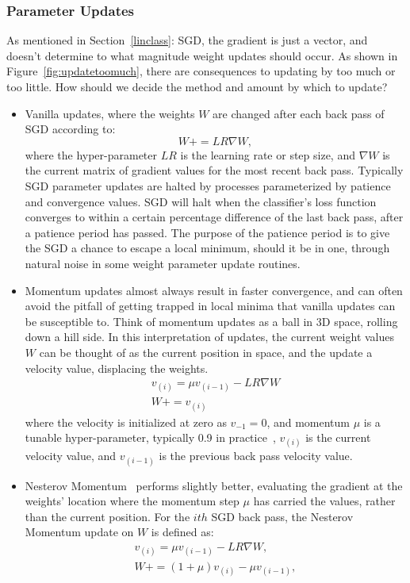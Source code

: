 \subsubsection{Parameter Updates}
As mentioned in Section~\ref{linclass}: SGD, the gradient is just a vector, and doesn't determine to what magnitude weight updates should occur. As shown in Figure~\ref{fig:updatetoomuch}, there are consequences to updating by too much or too little. How should we decide the method and amount by which to update?
\begin{itemize}
\item Vanilla updates, where the weights $W$ are changed after each back pass of SGD according to:
\begin{equation}
W += LR \nabla W,
\end{equation}
where the hyper-parameter $LR$ is the learning rate or step size, and $\nabla W$ is the current matrix of gradient values for the most recent back pass. Typically SGD parameter updates are halted by processes parameterized by patience and convergence values. SGD will halt when the classifier's loss function converges to within a certain percentage difference of the last back pass, after a patience period has passed. The purpose of the patience period is to give the SGD a chance to escape a local minimum, should it be in one, through natural noise in some weight parameter update routines.

\item Momentum updates almost always result in faster convergence, and can often avoid the pitfall of getting trapped in local minima that vanilla updates can be susceptible to. Think of momentum updates as a ball in 3D space, rolling down a hill side. In this interpretation of updates, the current weight values $W$ can be thought of as the current position in space, and the update a velocity value, displacing the weights.
\begin{subequations}
\label{eq:mom}
\begin{align}
v_{(i)} = \mu v_{(i-1)} - LR \nabla W
\\
W += v_{(i)}
\end{align}
\end{subequations}
where the velocity is initialized at zero as $v_{-1} = 0$, and momentum $\mu$ is a tunable hyper-parameter, typically 0.9 in practice~\cite{cs231}, $v_{(i)}$ is the current velocity value, and $v_{(i-1)}$ is the previous back pass velocity value.

\item Nesterov Momentum~\cite{n_moment} performs slightly better, evaluating the gradient at the weights' location where the momentum step $\mu$ has carried the values, rather than the current position. For the $ith$ SGD back pass, the Nesterov Momentum update on $W$ is defined as:
\begin{subequations}
\label{eq:nmom}
\begin{align}
v_{(i)} = \mu v_{(i-1)} - LR \nabla W,
\\
W += (1 + \mu) v_{(i)} - \mu v_{(i-1)},
\end{align}
\end{subequations}


\end{itemize}
